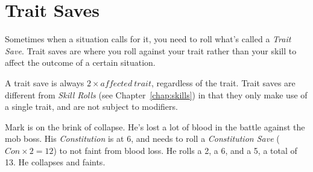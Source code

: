 \section{Trait Saves}
Sometimes when a situation calls for it, you need to roll what's called a \textit{Trait Save}.
Trait saves are where you roll against your trait rather than your skill to affect the outcome of a certain situation.

A trait save is always $2 \times \mathit{affected\ trait}$, regardless of the trait.
Trait saves are different from \textit{Skill Rolls} (see Chapter~\ref{chap:skills}) in that they only make use of a single trait, and are not subject to modifiers.

\example Mark is on the brink of collapse.
He's lost a lot of blood in the battle against the mob boss.
His \textit{Constitution} is at 6, and needs to roll a \textit{Constitution Save} ($Con \times 2 = 12$) to not faint from blood loss.
He rolls a 2, a 6, and a 5, a total of 13. He collapses and faints.
